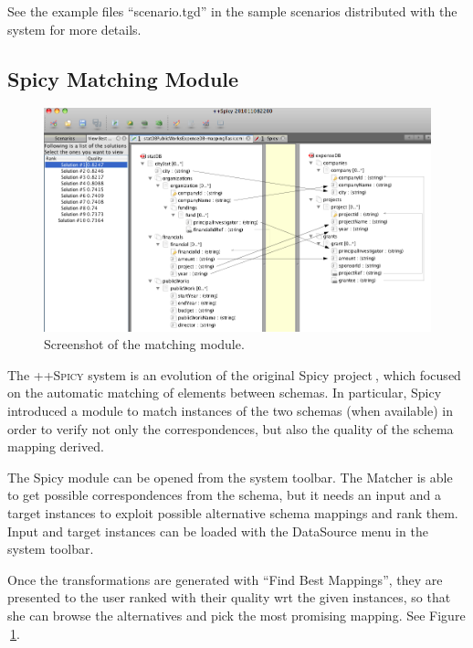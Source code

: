 \documentclass[12pt]{article}
\newcommand{\spicypp}{\textsc{++Spicy}}
\newcommand{\tld}{$~$}
\newcommand{\quotes}[1]{``#1''}
\newcommand{\removespace}{\vspace*{-0.35cm}}
\newcommand{\removelargespace}{\vspace*{-0.7cm}}
\begin{document}
See the example files \quotes{scenario.tgd} in the sample scenarios distributed with the system for more details.

\subsection{Spicy Matching Module} \label{sec:spicy}

\begin{figure}[htb]
\removespace
\begin{center}
\includegraphics[width=\columnwidth]{images/spicy.png}
\removespace
\caption{\small Screenshot of the matching module.} \label{fig:spicy}
\end{center}
\removelargespace
\end{figure}

The {\spicypp} system is an evolution of the original Spicy project\tld\cite{Bonifati2008,Bonifati08b}, which focused on the automatic matching of elements between schemas. In particular, Spicy introduced a module to match instances of the two schemas (when available) in order to verify not only the correspondences, but also the quality of the schema mapping derived. 

The Spicy module can be opened from the system toolbar. The Matcher is able to get possible correspondences from the schema, but it needs an input and a target instances to exploit possible alternative schema mappings and rank them. Input and target instances can be loaded with the DataSource menu in the system toolbar.

Once the transformations are generated with \quotes{Find Best Mappings}, they are presented to the user ranked with their quality wrt the given instances, so that she can browse the alternatives and pick the most promising mapping. See Figure\tld\ref{fig:spicy}. 
\end{document}
